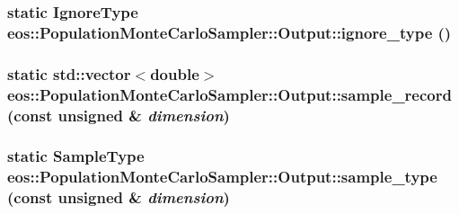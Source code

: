 \label{structeos_1_1PopulationMonteCarloSampler_1_1Output_a0bc83ed4bd2ec948236eced9b6be6684}
\hypertarget{structeos_1_1PopulationMonteCarloSampler_1_1Output_a7dea0b1d53d47e5099fa97136a4f27a5}{
\subsubsection[{ignore\_\-type}]{\setlength{\rightskip}{0pt plus 5cm}static {\bf IgnoreType} eos::PopulationMonteCarloSampler::Output::ignore\_\-type ()}}
\label{structeos_1_1PopulationMonteCarloSampler_1_1Output_a7dea0b1d53d47e5099fa97136a4f27a5}
\hypertarget{structeos_1_1PopulationMonteCarloSampler_1_1Output_a8091ae5b3a05edde2e076faafe0a02ab}{
\subsubsection[{sample\_\-record}]{\setlength{\rightskip}{0pt plus 5cm}static std::vector$<$double$>$ eos::PopulationMonteCarloSampler::Output::sample\_\-record (const unsigned \& {\em dimension})}}
\label{structeos_1_1PopulationMonteCarloSampler_1_1Output_a8091ae5b3a05edde2e076faafe0a02ab}
\hypertarget{structeos_1_1PopulationMonteCarloSampler_1_1Output_ac9825b152fa3750d77cb7face4fbaf41}{
\subsubsection[{sample\_\-type}]{\setlength{\rightskip}{0pt plus 5cm}static {\bf SampleType} eos::PopulationMonteCarloSampler::Output::sample\_\-type (const unsigned \& {\em dimension})}}
